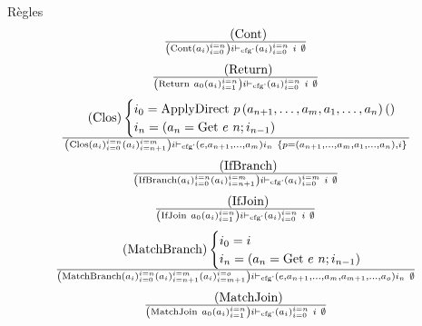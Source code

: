 \documentclass{beamer}
\begin{document}
\begin{frame}{Règles}
    \begin{gather}
        \tag{Cont}
        \over \left( \text{Cont} \left( a_i \right)_{i=0}^{i=n} \right) i \vdash_{\text{cfg'}} \left( a_i \right)_{i=0}^{i=n} ~ i ~ \emptyset
    \end{gather}
    \begin{gather}
        \tag{Return}
        \over \left( \text{Return} ~ a_0 \left( a_i \right)_{i=1}^{i=n} \right) i \vdash_{\text{cfg'}} \left( a_i \right)_{i=0}^{i=n} ~ i ~ \emptyset
    \end{gather}
    \begin{gather}
        \tag{Clos}
        \begin{cases}
           i_0 = \text{ApplyDirect} ~ p \left( a_{n+1}, \dots, a_m, a_1, \dots, a_n \right) \left( \right) \\
           i_n = \left( a_n = \text{Get} ~ e ~ n; i_{n-1} \right)
        \end{cases}
        \over \left( \text{Clos} \left( a_i \right)_{i=0}^{i=n} \left( a_i \right)_{i=n+1}^{i=m} \right) i \vdash_{\text{cfg'}} \left( e, a_{n+1}, \dots, a_m \right) i_n ~ \lbrace p = \left( a_{n+1}, \dots, a_m, a_1, \dots, a_n \right), i \rbrace
    \end{gather}
    \begin{gather}
        \tag{IfBranch}
        \over \left( \text{IfBranch} \left( a_i \right)_{i=0}^{i=n} \left( a_i \right)_{i=n+1}^{i=m} \right) i \vdash_{\text{cfg'}} \left( a_i \right)_{i=0}^{i=m} ~ i ~ \emptyset
    \end{gather}
    \begin{gather}
        \tag{IfJoin}
        \over \left( \text{IfJoin} ~ a_0 \left( a_i \right)_{i=1}^{i=n} \right) i \vdash_{\text{cfg'}} \left( a_i \right)_{i=0}^{i=n} ~ i ~ \emptyset
    \end{gather}
    \begin{gather}
        \tag{MatchBranch}
        \begin{cases}
           i_0 = i \\
           i_n = \left( a_n = \text{Get} ~ e ~ n; i_{n-1} \right)
        \end{cases}
        \over \left( \text{MatchBranch} \left( a_i \right)_{i=0}^{i=n} \left( a_i \right)_{i=n+1}^{i=m} \left( a_i \right)_{i=m+1}^{i=o} \right) i \vdash_{\text{cfg'}} \left( e, a_{n+1}, \dots, a_m, a_{m+1}, \dots, a_o \right) i_n ~ \emptyset
    \end{gather}
    \begin{gather}
        \tag{MatchJoin}
        \over \left( \text{MatchJoin} ~ a_0 \left( a_i \right)_{i=1}^{i=n} \right) i \vdash_{\text{cfg'}} \left( a_i \right)_{i=0}^{i=n} ~ i ~ \emptyset
    \end{gather}
\end{frame}
\end{document}
